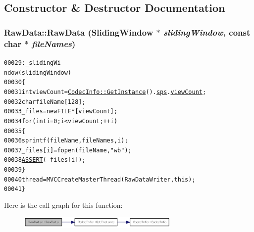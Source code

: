 \subsection{Constructor \& Destructor Documentation}
\hypertarget{class_raw_data_a9a8f2f3170c5574096ea14611f38aca8}{
\subsubsection[{RawData}]{\setlength{\rightskip}{0pt plus 5cm}RawData::RawData ({\bf SlidingWindow} $\ast$ {\em slidingWindow}, \/  const char $\ast$ {\em fileNames})}}
\label{class_raw_data_a9a8f2f3170c5574096ea14611f38aca8}




\begin{footnotesize}\begin{alltt}
00029                                                                      : \_slidingWi
      ndow(slidingWindow)
00030         \{
00031                 \textcolor{keywordtype}{int} viewCount = \hyperlink{class_codec_info_ad439fd8062a03d868dfe9c9b615b747e}{CodecInfo::GetInstance}().\hyperlink{class_codec_info_aee785011cec77ff3c0c646b498fe1e7d}{sps}.\hyperlink{struct_sequence_parameters_set_af32c7819f630856ccd99aaf78e8f656c}{viewCount};
00032                 \textcolor{keywordtype}{char} fileName[128];
00033                 \_files = \textcolor{keyword}{new} FILE*[viewCount];
00034                 \textcolor{keywordflow}{for} (\textcolor{keywordtype}{int} i = 0; i < viewCount; ++i)
00035                 \{
00036                         sprintf(fileName, fileNames, i);
00037                         \_files[i] = fopen(fileName, \textcolor{stringliteral}{"wb"});
00038                         \hyperlink{_debug_8h_a101586fab2b90a8adffe50a3550e235d}{ASSERT}(\_files[i]);
00039                 \}
00040                 thread = MVCCreateMasterThread(RawDataWriter, \textcolor{keyword}{this});
00041         \}
\end{alltt}\end{footnotesize}




Here is the call graph for this function:\nopagebreak
\begin{figure}[H]
\begin{center}
\leavevmode
\includegraphics[width=222pt]{class_raw_data_a9a8f2f3170c5574096ea14611f38aca8_cgraph}
\end{center}
\end{figure}


